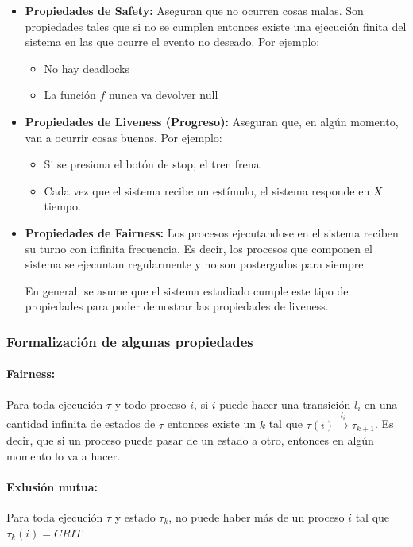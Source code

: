 \begin{itemize}
    \item \textbf{Propiedades de Safety:} Aseguran que no ocurren cosas malas. Son propiedades tales que si no se cumplen entonces existe una ejecución finita del sistema en las que ocurre el evento no deseado. Por ejemplo:
    \begin{itemize}
        \item No hay deadlocks
        \item La función $f$ nunca va devolver null
    \end{itemize}

    \item \textbf{Propiedades de Liveness (Progreso):} Aseguran que, en algún momento, van a ocurrir cosas buenas. Por ejemplo:
    \begin{itemize}
        \item Si se presiona el botón de stop, el tren frena.
        \item Cada vez que el sistema recibe un estímulo, el sistema responde en $X$ tiempo.
    \end{itemize}
    \item \textbf{Propiedades de Fairness:} Los procesos ejecutandose en el sistema reciben su turno con infinita frecuencia. Es decir, los procesos que componen el sistema se ejecuntan regularmente y no son postergados para siempre.
    
    En general, se asume que el sistema estudiado cumple este tipo de propiedades para poder demostrar las propiedades de liveness.
\end{itemize}

\subsubsection{Formalización de algunas propiedades}\label{sincro::form}

\paragraph{Fairness:} Para toda ejecución $\tau$ y todo proceso $i$, si $i$ puede hacer una transición $l_i$ en una cantidad infinita de estados de $\tau$ entonces existe un $k$ tal que $\tau(i)\overset{l_i}{\rightarrow}\tau_{k+1}$. Es decir, que si un proceso puede pasar de un estado a otro, entonces en algún momento lo va a hacer.

\paragraph{Exlusión mutua:} Para toda ejecución $\tau$ y estado $\tau_k$, no puede haber más de un proceso $i$ tal que $\tau_k(i) = CRIT$

